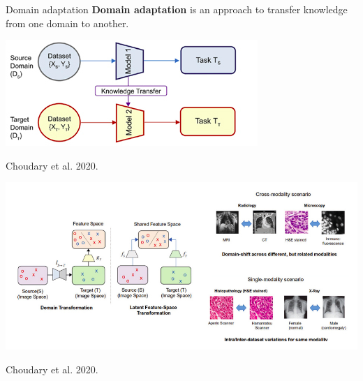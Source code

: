\documentclass[9pt, aspectratio=169]{beamer}
\begin{document}
\begin{frame}
    {Domain adaptation}
    \textbf{Domain adaptation} is an approach to transfer knowledge from one domain to another.

    \centering
    {
        \includegraphics[width=.6\textwidth]{Choudhary_2020_domain_adaptation.png}

        \footnotesize
        Choudary et al. 2020.
    }
    {
        \includegraphics[width=\textwidth]{Choudhary_2020_examples.png}

        \footnotesize
        \raggedright
        Choudary et al. 2020.
    }
\end{frame}
\end{document}
